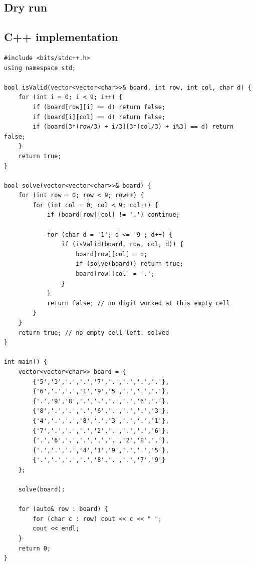 \subsection*{Dry run}


\subsection*{C++ implementation}

\begin{lstlisting}
#include <bits/stdc++.h>
using namespace std;

bool isValid(vector<vector<char>>& board, int row, int col, char d) {
    for (int i = 0; i < 9; i++) {
        if (board[row][i] == d) return false;
        if (board[i][col] == d) return false;
        if (board[3*(row/3) + i/3][3*(col/3) + i%3] == d) return false;
    }
    return true;
}

bool solve(vector<vector<char>>& board) {
    for (int row = 0; row < 9; row++) {
        for (int col = 0; col < 9; col++) {
            if (board[row][col] != '.') continue;

            for (char d = '1'; d <= '9'; d++) {
                if (isValid(board, row, col, d)) {
                    board[row][col] = d;
                    if (solve(board)) return true;
                    board[row][col] = '.';
                }
            }
            return false; // no digit worked at this empty cell
        }
    }
    return true; // no empty cell left: solved
}

int main() {
    vector<vector<char>> board = {
        {'5','3','.','.','7','.','.','.','.'},
        {'6','.','.','1','9','5','.','.','.'},
        {'.','9','8','.','.','.','.','6','.'},
        {'8','.','.','.','6','.','.','.','3'},
        {'4','.','.','8','.','3','.','.','1'},
        {'7','.','.','.','2','.','.','.','6'},
        {'.','6','.','.','.','.','2','8','.'},
        {'.','.','.','4','1','9','.','.','5'},
        {'.','.','.','.','8','.','.','7','9'}
    };

    solve(board);

    for (auto& row : board) {
        for (char c : row) cout << c << " ";
        cout << endl;
    }
    return 0;
}
\end{lstlisting}

